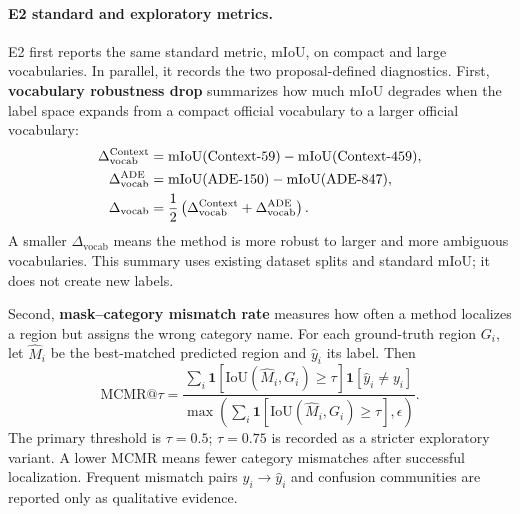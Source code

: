 \documentclass[11pt,a4paper]{article}
\begin{document}
\paragraph{E2 standard and exploratory metrics.}
E2 first reports the same standard metric, mIoU, on compact and large vocabularies. In parallel, it records the two proposal-defined diagnostics.
First, \textbf{vocabulary robustness drop} summarizes how much mIoU degrades when the label space expands from a compact official vocabulary to a larger official vocabulary:
\begin{align}
\Delta_{\mathrm{vocab}}^{\mathrm{Context}} &= \mathrm{mIoU}(\mathrm{Context}{\text -}59)-\mathrm{mIoU}(\mathrm{Context}{\text -}459),\\
\Delta_{\mathrm{vocab}}^{\mathrm{ADE}} &= \mathrm{mIoU}(\mathrm{ADE}{\text -}150)-\mathrm{mIoU}(\mathrm{ADE}{\text -}847),\\
\Delta_{\mathrm{vocab}} &= \frac{1}{2}\left(\Delta_{\mathrm{vocab}}^{\mathrm{Context}}+\Delta_{\mathrm{vocab}}^{\mathrm{ADE}}\right).
\end{align}
A smaller $\Delta_{\mathrm{vocab}}$ means the method is more robust to larger and more ambiguous vocabularies. This summary uses existing dataset splits and standard mIoU; it does not create new labels.

Second, \textbf{mask--category mismatch rate} measures how often a method localizes a region but assigns the wrong category name. For each ground-truth region $G_i$, let $\hat{M}_i$ be the best-matched predicted region and $\hat{y}_i$ its label. Then
\begin{equation}
\mathrm{MCMR@}\tau=
\frac{\sum_i \mathbf{1}[\mathrm{IoU}(\hat{M}_i,G_i)\ge \tau] \mathbf{1}[\hat{y}_i\ne y_i]}
{\max\left(\sum_i \mathbf{1}[\mathrm{IoU}(\hat{M}_i,G_i)\ge \tau],\epsilon\right)}.
\end{equation}
The primary threshold is $\tau=0.5$; $\tau=0.75$ is recorded as a stricter exploratory variant. A lower MCMR means fewer category mismatches after successful localization. Frequent mismatch pairs $y_i\rightarrow\hat{y}_i$ and confusion communities are reported only as qualitative evidence.
\end{document}
